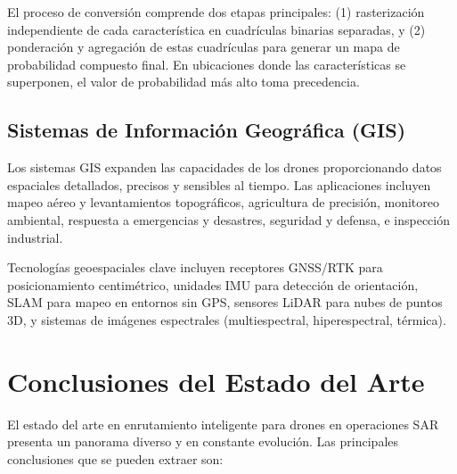 \documentclass[12pt]{report} %
\begin{document}
El proceso de conversión comprende dos etapas principales: (1) rasterización independiente de cada característica en cuadrículas binarias separadas, y (2) ponderación y agregación de estas cuadrículas para generar un mapa de probabilidad compuesto final. En ubicaciones donde las características se superponen, el valor de probabilidad más alto toma precedencia.

\section{Sistemas de Información Geográfica (GIS)}

Los sistemas GIS expanden las capacidades de los drones proporcionando datos espaciales detallados, precisos y sensibles al tiempo. Las aplicaciones incluyen mapeo aéreo y levantamientos topográficos, agricultura de precisión, monitoreo ambiental, respuesta a emergencias y desastres, seguridad y defensa, e inspección industrial.

Tecnologías geoespaciales clave incluyen receptores GNSS/RTK para posicionamiento centimétrico, unidades IMU para detección de orientación, SLAM para mapeo en entornos sin GPS, sensores LiDAR para nubes de puntos 3D, y sistemas de imágenes espectrales (multiespectral, hiperespectral, térmica).

\chapter{Conclusiones del Estado del Arte}

El estado del arte en enrutamiento inteligente para drones en operaciones SAR presenta un panorama diverso y en constante evolución. Las principales conclusiones que se pueden extraer son:
\end{document}
